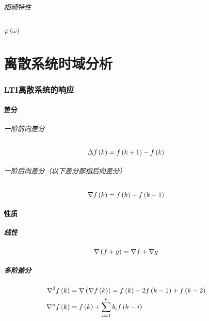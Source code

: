 \documentclass{article}
\begin{document}
\paragraph{相频特性}$\varphi\left(\omega\right)$

\part{离散系统时域分析}

\section{LTI离散系统的响应}

\subsection{差分}

\paragraph{一阶前向差分}

\[\Delta f\left(k\right)=f\left(k+1\right)-f\left(k\right)\]

\paragraph{一阶后向差分（以下差分都指后向差分）}

\[\nabla f\left(k\right)=f\left(k\right)-f\left(k-1\right)\]

\subsection{性质}

\subsubsection{线性}

\[\nabla\left(f+g\right)=\nabla f+\nabla g\]

\subsubsection{多阶差分}

\[\begin{aligned}
        \nabla^2f\left(k\right) & =\nabla\left(\nabla f\left(k\right)\right)=f\left(k\right)-2f\left(k-1\right)+f\left(k-2\right) \\
        \nabla^nf\left(k\right) & =f\left(k\right)+\sum_{i=1}^nb_if\left(k-i\right)
    \end{aligned}\]
\end{document}
